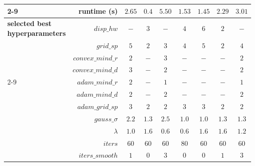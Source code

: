 \begin{table}[tbh]
{\begin{tabular}{lr|c|c|c|c|c|c|c}
 \cline{2-9}
&runtime (s) & $2.65$ & $0.4$ & $5.50$ & $1.53$ & $1.45$ & $2.29$ & $3.01$ \\
\midrule
\textbf{selected best} 
\textbf{hyperparameters} 
& $disp\_hw$ & $-$ & $3$ & $-$ & $4$ & $6$ & $2$ & $-$ \\
& $grid\_sp$ & $5$ & $2$ & $3$ & $4$ & $5$ & $2$ & $4$ \\
& $convex\_mind\_r$ & $2$ & $-$ & $3$ & $-$ & $-$ & $-$ & $2$ \\
& $convex\_mind\_d$ & $3$ & $-$ & $2$ & $-$ & $-$ & $-$ & $2$ \\
\cline{2-9}
& $adam\_mind\_r$ & $2$ & $-$ & $1$ & $-$ & $-$ & $-$ & $1$ \\
& $adam\_mind\_d$ & $2$ & $-$ & $2$ & $-$ & $-$ & $-$ & $2$ \\
& $adam\_grid\_sp$ & $3$ & $2$ & $2$ & $3$ & $3$ & $2$ & $2$ \\
& $gauss\_\sigma$ & $2.2$ & $1.3$ & $2.5$ & $1.0$ & $1.0$ & $1.3$ & $1.3$ \\
& $\lambda$ & $1.0$ & $1.6$ & $0.6$ & $0.6$ & $1.6$ & $1.6$ & $1.2$ \\
& $iters$ & $60$ & $60$ & $60$ & $80$ & $60$ & $60$ & $60$ \\
& $iters\_smooth$ & $1$ & $0$ & $3$ & $0$ & $0$ & $1$ & $3$ \\



\end{tabular}}
\end{table}

